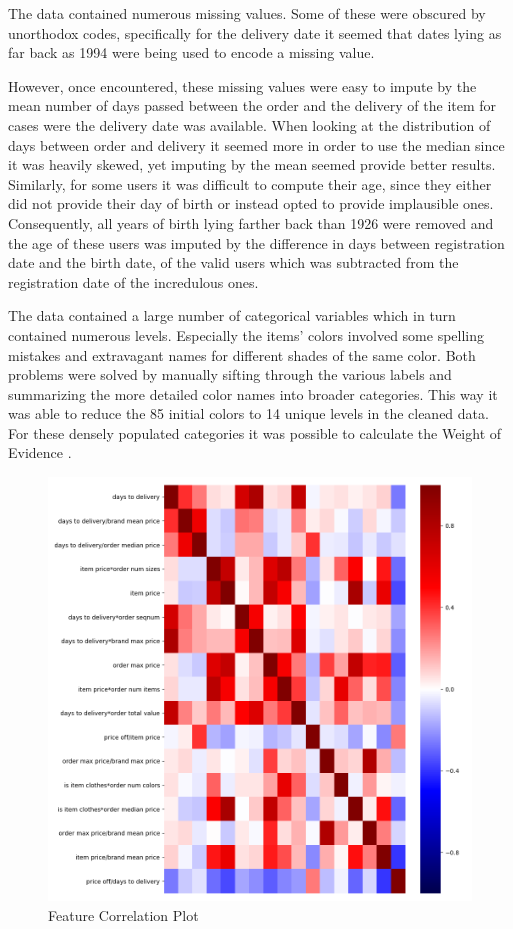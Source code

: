 
The data contained numerous missing values. Some of these were obscured by unorthodox codes, specifically for the delivery date it seemed that dates lying as far back as 1994 were being used to encode a missing value. 

However, once encountered, these missing values were easy to impute by the mean number of days passed between the order and the delivery of the item for cases were the delivery date was available. When looking at the distribution of days between order and delivery it seemed more in order to use the median since it was heavily skewed, yet imputing by the mean seemed provide better results. Similarly, for some users it was difficult to compute their age, since they either did not provide their day of birth or instead opted to provide implausible ones. Consequently, all years of birth lying farther back than 1926 were removed and the age of these users was imputed by the difference in days between registration date and the birth date, of the valid users which was subtracted from the registration date of the incredulous ones.

The data contained a large number of categorical variables which in turn contained numerous levels. Especially the items' colors involved some spelling mistakes and extravagant names for different shades of the same color. Both problems were solved by manually sifting through the various labels and summarizing the more detailed color names into broader categories. This way it was able to reduce the 85 initial colors to 14 unique levels in the cleaned data. For these densely populated categories it was possible to calculate the Weight of Evidence \cite{woe}.


\begin{figure}
\caption{Feature Correlation Plot}
\includegraphics[scale=0.28]{../eda/corrplot.png}
\end{figure}

